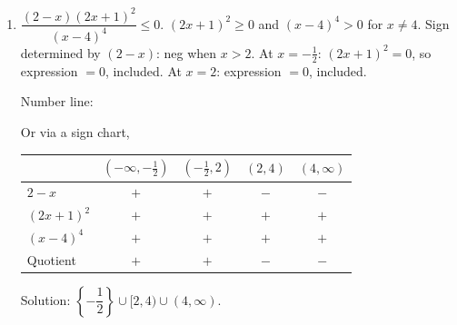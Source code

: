 \documentclass{ximera}
\begin{document}
\begin{problem}
\begin{solution}
\begin{enumerate}
  Or via a sign chart,
\begin{center}
\renewcommand{\arraystretch}{1.3}
\begin{tabular}{l|cccc}
 & $(-\infty,-3)$ & $(-3,-1)$ & $(-1,2)$ & $(2,\infty)$ \\\hline
$w-2$ & {\color{red}$-$} & {\color{red}$-$} & {\color{red}$-$} & {\color{blue}$+$} \\
$w+1$ & {\color{red}$-$} & {\color{red}$-$} & {\color{blue}$+$} & {\color{blue}$+$} \\
$w+3$ & {\color{red}$-$} & {\color{blue}$+$} & {\color{blue}$+$} & {\color{blue}$+$} \\\hline
Quotient & {\color{red}$-$} & {\color{blue}$+$} & {\color{red}$-$} & {\color{blue}$+$}
\end{tabular}
\end{center}
  Solution: $(-3,-1]\cup[2,\infty)$.

  \item[(f)] $\dfrac{(2-x)(2x+1)^2}{(x-4)^4}\leq 0$. $(2x+1)^2\geq 0$ and $(x-4)^4>0$ for $x\neq4$. Sign determined by $(2-x)$: neg when $x>2$.
  At $x=-\tfrac{1}{2}$: $(2x+1)^2=0$, so expression $=0$, included. At $x=2$: expression $=0$, included.

  Number line:
\begin{center}
\end{center}

  Or via a sign chart,
\begin{center}
\renewcommand{\arraystretch}{1.3}
\begin{tabular}{l|cccc}
 & $(-\infty,-\tfrac{1}{2})$ & $(-\tfrac{1}{2},2)$ & $(2,4)$ & $(4,\infty)$ \\\hline
$2-x$ & {\color{blue}$+$} & {\color{blue}$+$} & {\color{red}$-$} & {\color{red}$-$} \\
$(2x+1)^2$ & {\color{blue}$+$} & {\color{blue}$+$} & {\color{blue}$+$} & {\color{blue}$+$} \\
$(x-4)^4$ & {\color{blue}$+$} & {\color{blue}$+$} & {\color{blue}$+$} & {\color{blue}$+$} \\\hline
Quotient & {\color{blue}$+$} & {\color{blue}$+$} & {\color{red}$-$} & {\color{red}$-$}
\end{tabular}
\end{center}
  Solution: $\left\{-\dfrac{1}{2}\right\}\cup[2,4)\cup(4,\infty)$.


\end{enumerate}
\end{solution}
\end{problem}
\end{document}

